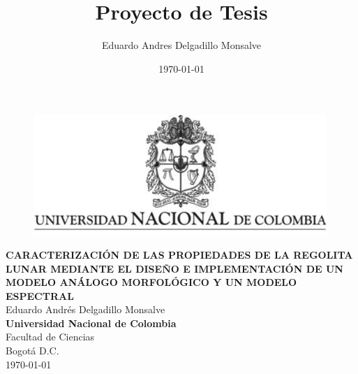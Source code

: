 \documentclass[12pt]{article}
\title{Proyecto de Tesis}
\author{Eduardo Andres Delgadillo Monsalve}
\date{\today}
\begin{document}
\renewcommand{\tablename}{Tabla}%
\renewcommand{\listtablename}{Índice de tablas}
\begin{titlepage}
    \centering
    \thispagestyle{empty}
    \begin{center}
        \begin{figure}
        \centering%
        \includegraphics{images/EscudoUN.png}
    \end{figure}
    
    \vspace{3cm}
    
    \textbf{CARACTERIZACIÓN DE LAS PROPIEDADES DE LA REGOLITA LUNAR MEDIANTE EL DISEÑO E IMPLEMENTACIÓN DE UN MODELO ANÁLOGO MORFOLÓGICO Y UN MODELO ESPECTRAL}\\[1in]    
    Eduardo Andrés Delgadillo Monsalve \\  [3in]

   \textbf{Universidad Nacional de Colombia}\\
   Facultad de Ciencias\\
   Bogotá D.C.\\
   \today
    \end{center}
\end{titlepage}
\end{document}
